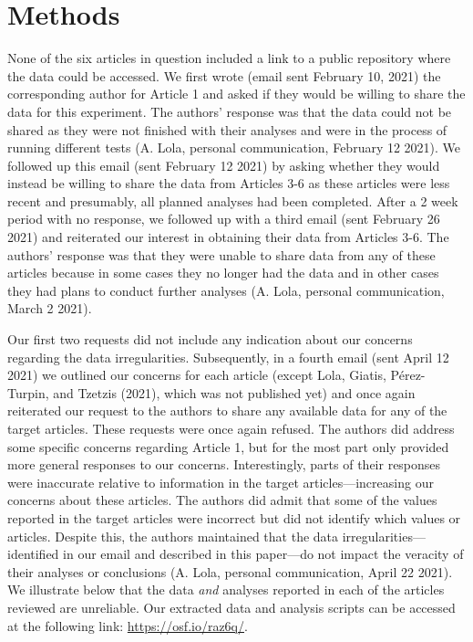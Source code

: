 \documentclass[
  english,
  man, donotrepeattitle,floatsintext]{apa7}
\begin{document}
\hypertarget{methods}{%
\section{Methods}\label{methods}}

None of the six articles in question included a link to a public repository where the data could be accessed. We first wrote (email sent February 10, 2021) the corresponding author for Article 1 and asked if they would be willing to share the data for this experiment. The authors' response was that the data could not be shared as they were not finished with their analyses and were in the process of running different tests (A. Lola, personal communication, February 12 2021). We followed up this email (sent February 12 2021) by asking whether they would instead be willing to share the data from Articles 3-6 as these articles were less recent and presumably, all planned analyses had been completed. After a 2 week period with no response, we followed up with a third email (sent February 26 2021) and reiterated our interest in obtaining their data from Articles 3-6. The authors' response was that they were unable to share data from any of these articles because in some cases they no longer had the data and in other cases they had plans to conduct further analyses (A. Lola, personal communication, March 2 2021).

Our first two requests did not include any indication about our concerns regarding the data irregularities. Subsequently, in a fourth email (sent April 12 2021) we outlined our concerns for each article (except Lola, Giatis, Pérez-Turpin, and Tzetzis (2021), which was not published yet) and once again reiterated our request to the authors to share any available data for any of the target articles. These requests were once again refused. The authors did address some specific concerns regarding Article 1, but for the most part only provided more general responses to our concerns. Interestingly, parts of their responses were inaccurate relative to information in the target articles---increasing our concerns about these articles. The authors did admit that some of the values reported in the target articles were incorrect but did not identify which values or articles. Despite this, the authors maintained that the data irregularities---identified in our email and described in this paper---do not impact the veracity of their analyses or conclusions (A. Lola, personal communication, April 22 2021). We illustrate below that the data \emph{and} analyses reported in each of the articles reviewed are unreliable. Our extracted data and analysis scripts can be accessed at the following link: \url{https://osf.io/raz6q/}.
\end{document}
